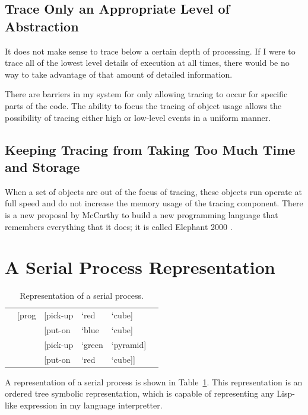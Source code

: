 \subsection{Trace Only an Appropriate Level of Abstraction}

It does not make sense to trace below a certain depth of processing.
If I were to trace all of the lowest level details of execution at
all times, there would be no way to take advantage of that amount
of detailed information.

There are barriers in my system for only allowing tracing to occur for
specific parts of the code.  The ability to focus the tracing of object
usage allows the possibility of tracing either high or low-level events
in a uniform manner.

\subsection{Keeping Tracing from Taking Too Much Time and Storage}

When a set of objects are out of the focus of tracing, these objects run
operate at full speed and do not increase the memory usage of the
tracing component.  There is a new proposal by McCarthy to build a new
programming language that remembers everything that it does; it is
called Elephant 2000 \citep{mccarthy:1994}.



\section{A Serial Process Representation}
\label{sec:serial_process_representation}

\begin{table}
  \myfloatalign
  \begin{tabularx}{\textwidth}{XllllX}
    & [prog & [pick-up & `red   & `cube]    & \\
    &       & [put-on  & `blue  & `cube]    & \\
    &       & [pick-up & `green & `pyramid] & \\
    &       & [put-on  & `red   & `cube]]   & \\
  \end{tabularx}
  \caption[Representation of a serial process]{Representation of a serial process.}
  \label{tab:serial_process_representation}
\end{table}

A representation of a serial process is shown in
Table~\ref{tab:serial_process_representation}.  This representation is
an ordered tree symbolic representation, which is capable of
representing any Lisp-like expression in my language interpretter.

